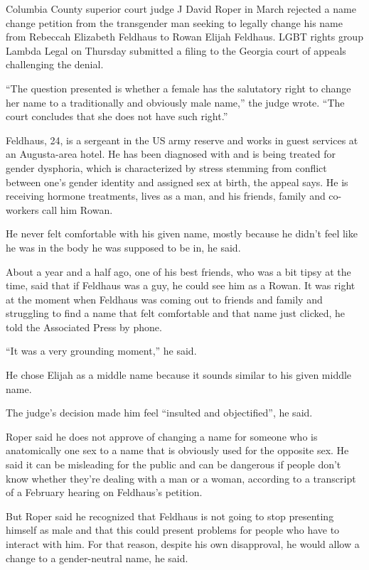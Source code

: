 Columbia County superior court judge J David Roper in March rejected a name change petition from the transgender man seeking to legally change his name from Rebeccah Elizabeth Feldhaus to Rowan Elijah Feldhaus. LGBT rights group Lambda Legal on Thursday submitted a filing to the Georgia court of appeals challenging the denial.

“The question presented is whether a female has the salutatory right to change her name to a traditionally and obviously male name,” the judge wrote. “The court concludes that she does not have such right.”

Feldhaus, 24, is a sergeant in the US army reserve and works in guest services at an Augusta-area hotel. He has been diagnosed with and is being treated for gender dysphoria, which is characterized by stress stemming from conflict between one’s gender identity and assigned sex at birth, the appeal says. He is receiving hormone treatments, lives as a man, and his friends, family and co-workers call him Rowan.

He never felt comfortable with his given name, mostly because he didn’t feel like he was in the body he was supposed to be in, he said.

About a year and a half ago, one of his best friends, who was a bit tipsy at the time, said that if Feldhaus was a guy, he could see him as a Rowan. It was right at the moment when Feldhaus was coming out to friends and family and struggling to find a name that felt comfortable and that name just clicked, he told the Associated Press by phone.

“It was a very grounding moment,” he said.

He chose Elijah as a middle name because it sounds similar to his given middle name.

The judge’s decision made him feel “insulted and objectified”, he said.

Roper said he does not approve of changing a name for someone who is anatomically one sex to a name that is obviously used for the opposite sex. He said it can be misleading for the public and can be dangerous if people don’t know whether they’re dealing with a man or a woman, according to a transcript of a February hearing on Feldhaus’s petition.

But Roper said he recognized that Feldhaus is not going to stop presenting himself as male and that this could present problems for people who have to interact with him. For that reason, despite his own disapproval, he would allow a change to a gender-neutral name, he said.


